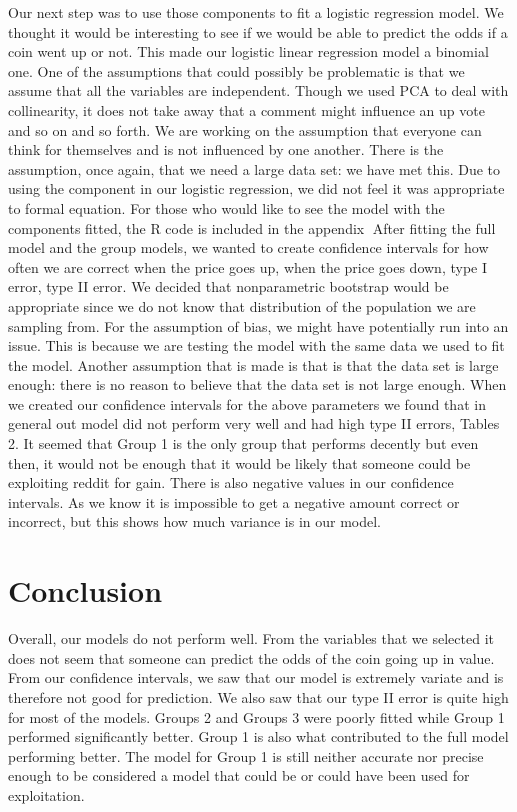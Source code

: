 \documentclass[12pt]{article}
\begin{document}
\indent Our next step was to use those components to fit a logistic regression model. We thought it would be interesting to see if we would be able to predict the odds if a coin went up or not. This made our logistic linear regression model a binomial one. One of the assumptions that could possibly be problematic is that we assume that all the variables are independent. Though we used PCA to deal with collinearity, it does not take away that a comment might influence an up vote and so on and so forth. We are working on the assumption that everyone can think for themselves and is not influenced by one another. There is the assumption, once again, that we need a large data set: we have met this. Due to using the component in our logistic regression, we did not feel it was appropriate to formal equation. For those who would like to see the model with the components fitted, the R code is included in the appendix
\indent After fitting the full model and the group models, we wanted to create confidence intervals for how often we are correct when the price goes up, when the price goes down, type I error, type II error. We decided that nonparametric bootstrap would be appropriate since we do not know that distribution of the population we are sampling from. For the assumption of bias, we might have potentially run into an issue. This is because we are testing the model with the same data we used to fit the model. Another assumption that is made is that is that the data set is large enough: there is no reason to believe that the data set is not large enough. When we created our confidence intervals for the above parameters we found that in general out model did not perform very well and had high type II errors, Tables 2. It seemed that Group 1 is the only group that performs decently but even then, it would not be enough that it would be likely that someone could be exploiting reddit for gain. There is also negative values in our confidence intervals. As we know it is impossible to get a negative amount correct or incorrect, but this shows how much variance is in our model.

\section{Conclusion}
\indent\indent Overall, our models do not perform well. From the variables that we selected it does not seem that someone can predict the odds of the coin going up in value. From our confidence intervals, we saw that our model is extremely variate and is therefore not good for prediction. We also saw that our type II error is quite high for most of the models. Groups 2 and Groups 3 were poorly fitted while Group 1 performed significantly better. Group 1 is also what contributed to the full model performing better. The model for Group 1 is still neither accurate nor precise enough to be considered a model that could be or could have been used for exploitation.
\end{document}
